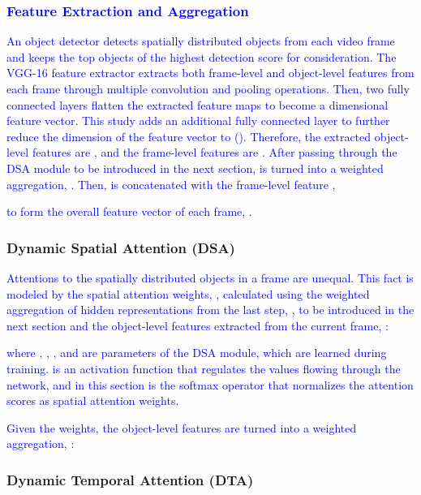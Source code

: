 \documentclass[journal]{IEEEtran}
\begin{document}
\subsubsection{\textcolor{blue}{Feature Extraction and Aggregation}}

\textcolor{blue}{
An object detector detects spatially distributed objects from each video frame and keeps the top  objects of the highest detection score for consideration. The VGG-16 \cite{Simonyan15} feature extractor extracts both frame-level and object-level features from each frame  through multiple convolution and pooling operations. Then, two fully connected layers flatten the extracted feature maps to become a  dimensional feature vector. This study adds an additional fully connected layer to further reduce the dimension of the feature vector to  (). Therefore, the extracted object-level features are , and the frame-level features are . After passing through the DSA module to be introduced in the next section,  is turned into a weighted aggregation,  . Then,  is concatenated with the frame-level feature ,

to form the overall feature vector of each frame, .}


\subsubsection{Dynamic Spatial Attention (DSA)}
\label{sub:sa}

\textcolor{blue}{Attentions to the spatially distributed objects in a frame are unequal. This fact is modeled by the spatial attention weights, , calculated using the weighted aggregation of hidden representations from the last step, , to be introduced in the next section and the object-level features extracted from the current frame, : 

where
, , , and  are parameters of the DSA module, \textcolor{blue}{which are learned during training}. \textcolor{blue}{ is an activation function that regulates the values flowing through the network, and}  in this section is the softmax operator \textcolor{blue}{that normalizes the attention scores as spatial attention weights.}}
\textcolor{blue}{
Given the weights, the object-level features are turned into a weighted aggregation, :
}

\subsubsection{Dynamic Temporal Attention (DTA)}
\end{document}

